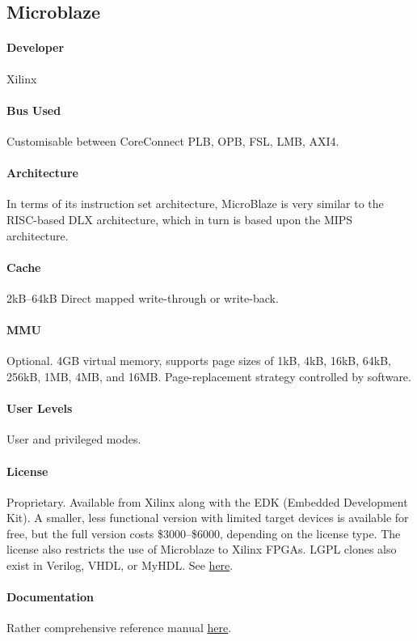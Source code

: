\subsection{Microblaze}
\paragraph{Developer} Xilinx
\paragraph{Bus Used} Customisable between CoreConnect PLB, OPB, FSL, LMB, AXI4.
\paragraph{Architecture} In terms of its instruction set architecture, MicroBlaze is very similar to the RISC-based DLX architecture, which in turn is based upon the MIPS architecture.
\paragraph{Cache} 2kB--64kB Direct mapped write-through or write-back.
\paragraph{MMU} Optional. 4GB virtual memory, supports page sizes of 1kB, 4kB, 16kB, 64kB, 256kB, 1MB, 4MB, and 16MB. Page-replacement strategy controlled by software.
\paragraph{User Levels} User and privileged modes.
\paragraph{License} Proprietary. Available from Xilinx along with the EDK (Embedded Development Kit). A smaller, less functional version with limited target devices is available for free, but the full version costs \$3000--\$6000, depending on the license type. The license also restricts the use of Microblaze to Xilinx FPGAs. LGPL clones also exist in Verilog, VHDL, or MyHDL. See \href{http://en.wikipedia.org/wiki/MicroBlaze#Clones}{here}.
\paragraph{Documentation} Rather comprehensive reference manual \href{http://www.xilinx.com/support/documentation/sw_manuals/xilinx11/mb_ref_guide.pdf}{here}.
